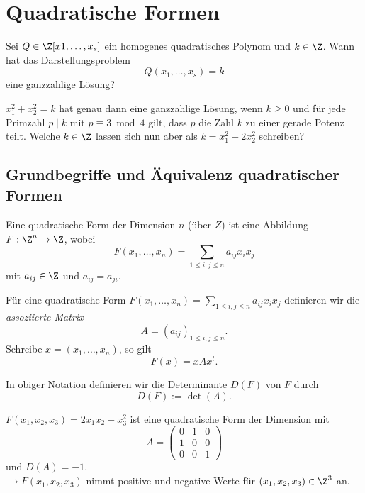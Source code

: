 \chapter{Quadratische Formen}

\begin{frage*}
	Sei $Q \in \Z[x1, \dotsc, x_s]$ ein homogenes quadratisches Polynom und $k \in \Z$. Wann hat das Darstellungsproblem
	\[ Q(x_1, \dotsc, x_s) = k \]
	eine ganzzahlige Lösung?
\end{frage*}

\begin{exmp*}
	$x_1^2 + x_2^2 = k$ hat genau dann eine ganzzahlige Lösung, wenn $k \geq 0$ und für jede Primzahl $p \mid k$ mit $p \equiv 3 \bmod 4$ gilt, dass $p$ die Zahl $k$ zu einer gerade Potenz teilt. Welche $k \in \Z$ lassen sich nun aber als $k = x_1^2 + 2x_2^2$ schreiben?
\end{exmp*}

\section{Grundbegriffe und Äquivalenz quadratischer Formen}

\begin{defn*} 
	Eine quadratische Form der Dimension $n$ (über $Z$) ist eine Abbildung $F: \Z^n \to \Z$, wobei
	\[ F(x_1,\dotsc,x_n) = \sum_{1 \leq i, j \leq n} a_{ij} x_i x_j \]
	mit $a_{ij} \in \Z$ und $a_{ij} = a_{ji}$.
\end{defn*}

\begin{rem*}
	Für eine quadratische Form $F(x_1, \dotsc, x_n) = \sum_{1 \leq i, j \leq n} a_{ij} x_i x_j$ definieren wir die \emph{assoziierte Matrix}
	\[ A = (a_{ij})_{1 \leq i,j \leq n}. \]
	Schreibe $x = (x_1, \dotsc, x_n)$, so gilt
	\[ F(x) = x A x^t. \]
\end{rem*}

\begin{defn*}[Determinante]
	In obiger Notation definieren wir die Determinante $D(F)$ von $F$ durch
	\[ D(F) := \det(A). \]
\end{defn*}

\begin{exmp*}
	$F(x_1,x_2,x_3) = 2x_1x_2 + x_3^2$ ist eine quadratische Form der Dimension mit \[ A = \begin{pmatrix}
		0&1&0\\1&0&0\\0&0&1
	\end{pmatrix} \]
	und $D(A) = -1$.\\
	$\to F(x_1,x_2,x_3)$ nimmt positive und negative Werte für $(x_1,x_2,x_3) \in \Z^3$ an.
\end{exmp*}

